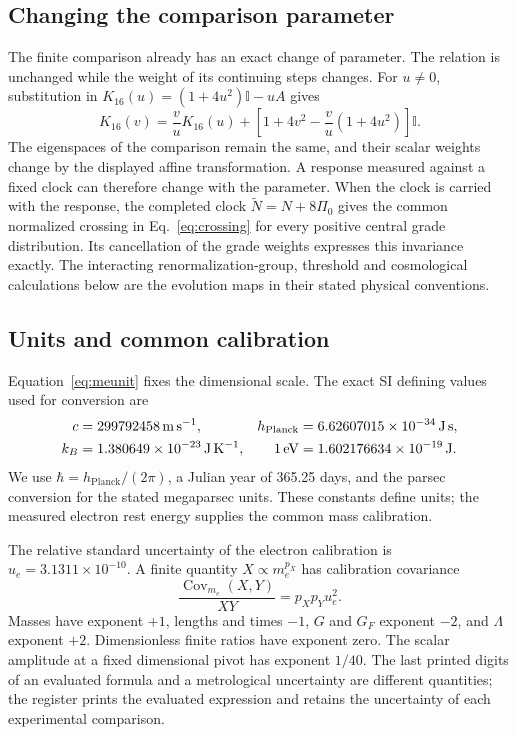 \documentclass[aps,prx,onecolumn,10pt,notitlepage,nofootinbib,longbibliography]{revtex4-2}
\numberwithin{equation}{section}
\numberwithin{table}{section}
\newcommand{\Id}{\mathbb I}
\begin{document}
\subsection{Changing the comparison parameter}
The finite comparison already has an exact change of parameter. The relation is unchanged while the weight of its continuing steps changes. For $u\ne0$, substitution in $K_{16}(u)=(1+4u^2)\Id-uA$ gives
\begin{equation}
 K_{16}(v)=\frac vu K_{16}(u)
 +\left[1+4v^2-\frac vu(1+4u^2)\right]\Id.
 \label{eq:finiteparameter}
\end{equation}
The eigenspaces of the comparison remain the same, and their scalar weights change by the displayed affine transformation. A response measured against a fixed clock can therefore change with the parameter. When the clock is carried with the response, the completed clock $\widetilde N=N+8\Pi_0$ gives the common normalized crossing in Eq.~\eqref{eq:crossing} for every positive central grade distribution. Its cancellation of the grade weights expresses this invariance exactly. The interacting renormalization-group, threshold and cosmological calculations below are the evolution maps in their stated physical conventions.

\subsection{Units and common calibration}
Equation~\eqref{eq:meunit} fixes the dimensional scale. The exact SI defining values used for conversion are
\begin{align}
 c&=299792458\,\mathrm{m\,s^{-1}},&
 h_{\mathrm{Planck}}&=6.62607015\times10^{-34}\,\mathrm{J\,s},\notag\\
 k_B&=1.380649\times10^{-23}\,\mathrm{J\,K^{-1}},&
 1\,\mathrm{eV}&=1.602176634\times10^{-19}\,\mathrm J .
\end{align}
We use $\hbar=h_{\mathrm{Planck}}/(2\pi)$, a Julian year of 365.25 days, and the parsec conversion for the stated megaparsec units. These constants define units; the measured electron rest energy supplies the common mass calibration.\cite{CODATA,SI}

The relative standard uncertainty of the electron calibration is $u_e=3.1311\times10^{-10}$. A finite quantity $X\propto m_e^{p_X}$ has calibration covariance
\begin{equation}
 \frac{\operatorname{Cov}_{m_e}(X,Y)}{XY}=p_Xp_Yu_e^2.
\end{equation}
Masses have exponent $+1$, lengths and times $-1$, $G$ and $G_F$ exponent $-2$, and $\Lambda$ exponent $+2$. Dimensionless finite ratios have exponent zero. The scalar amplitude at a fixed dimensional pivot has exponent $1/40$. The last printed digits of an evaluated formula and a metrological uncertainty are different quantities; the register prints the evaluated expression and retains the uncertainty of each experimental comparison.
\end{document}
